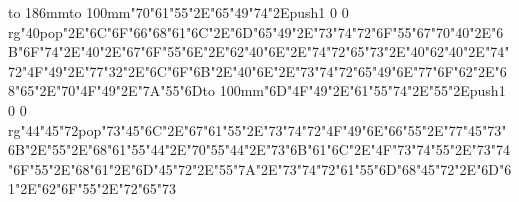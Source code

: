 \hbox to 186mm{\hsize=81mm\vbox to 100mm{\vfill\ipa\char"70\ipa\char"61\ipa\char"55\ipa\char"2E\ipa\char"65\ipa\char"49\ipa\char"74\ipa\char"2E\pdfcolorstack\match push{1 0 0 rg}\ipa\char"40\pdfcolorstack\match pop{}\ipa\char"2E\ipa\char"6C\ipa\char"6F\ipa\char"66\medskip\ipa\char"68\ipa\char"61\ipa\char"6C\ipa\char"2E\ipa\char"6D\ipa\char"65\ipa\char"49\ipa\char"2E\ipa\char"73\ipa\char"74\ipa\char"72\ipa\char"6F\ipa\char"55\ipa\char"67\medskip\ipa\char"70\ipa\char"40\ipa\char"2E\ipa\char"6B\ipa\char"6F\ipa\char"74\ipa\char"2E\ipa\char"40\ipa\char"2E\ipa\char"67\ipa\char"6F\ipa\char"55\ipa\char"6E\ipa\char"2E\ipa\char"62\ipa\char"40\ipa\char"6E\ipa\char"2E\ipa\char"74\ipa\char"72\ipa\char"65\ipa\char"73\ipa\char"2E\ipa\char"40\ipa\char"62\medskip\ipa\char"40\ipa\char"2E\ipa\char"74\ipa\char"72\ipa\char"4F\ipa\char"49\ipa\char"2E\ipa\char"77\ipa\char"32\ipa\char"2E\ipa\char"6C\ipa\char"6F\ipa\char"6B\ipa\char"2E\ipa\char"40\ipa\char"6E\ipa\char"2E\ipa\char"73\ipa\char"74\ipa\char"72\ipa\char"65\ipa\char"49\ipa\char"6E\medskip\ipa\char"77\ipa\char"6F\ipa\char"62\ipa\char"2E\ipa\char"68\ipa\char"65\ipa\char"2E\ipa\char"70\ipa\char"4F\ipa\char"49\ipa\char"2E\ipa\char"7A\ipa\char"55\ipa\char"6D\vfill}\hfill\vbox to 100mm{\vfill\ipa\char"6D\ipa\char"4F\ipa\char"49\ipa\char"2E\ipa\char"61\ipa\char"55\ipa\char"74\ipa\char"2E\ipa\char"55\ipa\char"2E\pdfcolorstack\match push{1 0 0 rg}\ipa\char"44\ipa\char"45\ipa\char"72\pdfcolorstack\match pop{}\medskip\ipa\char"73\ipa\char"45\ipa\char"6C\ipa\char"2E\ipa\char"67\ipa\char"61\ipa\char"55\ipa\char"2E\ipa\char"73\ipa\char"74\ipa\char"72\ipa\char"4F\ipa\char"49\ipa\char"6E\medskip\ipa\char"66\ipa\char"55\ipa\char"2E\ipa\char"77\ipa\char"45\ipa\char"73\ipa\char"6B\ipa\char"2E\ipa\char"55\ipa\char"2E\ipa\char"68\ipa\char"61\ipa\char"55\ipa\char"44\ipa\char"2E\ipa\char"70\ipa\char"55\ipa\char"44\ipa\char"2E\ipa\char"73\ipa\char"6B\ipa\char"61\ipa\char"6C\ipa\char"2E\ipa\char"4F\ipa\char"73\ipa\char"74\medskip\ipa\char"55\ipa\char"2E\ipa\char"73\ipa\char"74\ipa\char"6F\ipa\char"55\ipa\char"2E\ipa\char"68\ipa\char"61\ipa\char"2E\ipa\char"6D\ipa\char"45\ipa\char"72\ipa\char"2E\ipa\char"55\ipa\char"7A\ipa\char"2E\ipa\char"73\ipa\char"74\ipa\char"72\ipa\char"61\ipa\char"55\ipa\char"6D\medskip\ipa\char"68\ipa\char"45\ipa\char"72\ipa\char"2E\ipa\char"6D\ipa\char"61\ipa\char"2E\ipa\char"62\ipa\char"6F\ipa\char"55\ipa\char"2E\ipa\char"72\ipa\char"65\ipa\char"73\vfill}}\eject
